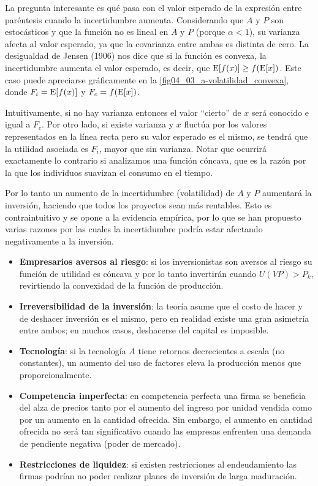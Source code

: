 \documentclass[DeGregorioResumen]{subfiles}
\begin{document}
La pregunta interesante es qué pasa con el valor esperado de la expresión entre paréntesis cuando la incertidumbre aumenta. Considerando que $A$ y $P$ son estocásticos y que la función no es lineal en $A$ y $P$ (porque $\alpha<1$), su varianza afecta al valor esperado, ya que la covarianza entre ambas es distinta de cero. La desigualdad de Jensen (1906) nos dice que si la función es convexa, la incertidumbre aumenta el valor esperado, es decir, que $\operatorname{E}[f(x)] \geq f(\operatorname{E}[x])$. Este caso puede apreciarse gráficamente en la \autoref{fig04_03_a-volatilidad_convexa}, donde $F_i=\operatorname{E}[f(x)]$ y $F_c=f(\operatorname{E}[x])$.



Intuitivamente, si no hay varianza entonces el valor ``cierto'' de $x$ será conocido e igual a $F_c$. Por otro lado, si existe varianza y $x$ fluctúa por los valores representados en la línea recta pero su valor esperado es el mismo, se tendrá que la utilidad asociada es $F_i$, mayor que sin varianza. Notar que ocurrirá exactamente lo contrario si analizamos una función cóncava, que es la razón por la que los individuos suavizan el consumo en el tiempo.

Por lo tanto un aumento de la incertidumbre (volatilidad) de $A$ y $P$ aumentará la inversión, haciendo que todos los proyectos sean más rentables. Esto es contraintuitivo y se opone a la evidencia empírica, por lo que se han propuesto varias razones por las cuales la incertidumbre podría estar afectando negativamente a la inversión.

\begin{itemize}
\item \textbf{Empresarios aversos al riesgo}: si los inversionistas son aversos al riesgo su función de utilidad es cóncava y por lo tanto invertirán cuando $U(VP)>P_k$, revirtiendo la convexidad de la función de producción.
\item \textbf{Irreversibilidad de la inversión}: la teoría asume que el costo de hacer y de deshacer inversión es el mismo, pero en realidad existe una gran asimetría entre ambos; en muchos casos, deshacerse del capital es imposible.
\item \textbf{Tecnología}: si la tecnología $A$ tiene retornos decrecientes a escala (no constantes), un aumento del uso de factores eleva la producción menos que proporcionalmente.
\item \textbf{Competencia imperfecta}: en competencia perfecta una firma se beneficia del alza de precios tanto por el aumento del ingreso por unidad vendida como por un aumento en la cantidad ofrecida. Sin embargo, el aumento en cantidad ofrecida no será tan significativo cuando las empresas enfrenten una demanda de pendiente negativa (poder de mercado).
\item \textbf{Restricciones de liquidez}: si existen restricciones al endeudamiento las firmas podrían no poder realizar planes de inversión de larga maduración.
\end{itemize}
\end{document}
